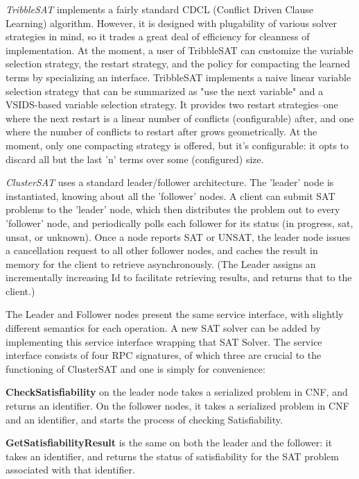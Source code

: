 \documentclass[10pt]{article}
\begin{document}
  \textit{TribbleSAT} implements a fairly standard CDCL (Conflict Driven Clause Learning) algorithm.  However, it is designed with plugability of various
  solver strategies in mind, so it trades a great deal of efficiency for cleanness of implementation.  At the moment, a user of TribbleSAT can customize
  the variable selection strategy, the restart strategy, and the policy for compacting the learned terms by specializing an interface.  TribbleSAT implements
  a naive linear variable selection strategy that can be summarized as "use the next variable" and a VSIDS-based variable selection strategy.  It provides two
  restart strategies--one where the next restart is a linear number of conflicts (configurable) after, and one where the number of conflicts to restart after grows geometrically.
  At the moment, only one compacting strategy is offered, but it's configurable:  it opts to discard all but the last 'n' terms over some (configured) size.
  
  \textit{ClusterSAT} uses a standard leader/follower architecture.  The 'leader' node is instantiated, knowing about all the 'follower' nodes.  A client
  can submit SAT problems to the 'leader' node, which then distributes the problem out to every 'follower' node, and periodically polls each follower
  for its status (in progress, sat, unsat, or unknown).  Once a node reports SAT or UNSAT, the leader node issues a cancellation request to all other follower nodes, and 
  caches the result in memory for the client to retrieve asynchronously.  (The Leader assigns an incrementally increasing Id to facilitate retrieving results, and returns that to the client.)
  
  The Leader and Follower nodes present the same service interface, with slightly different semantics for each operation.  A new SAT solver can be added by implementing
  this service interface wrapping that SAT Solver.  The service interface consists of four RPC signatures, of which three are crucial to the functioning of ClusterSAT and one is 
  simply for convenience:
  
	\textbf{CheckSatisfiability} on the leader node takes a serialized problem in CNF, and returns an identifier.  On the follower nodes, it takes a serialized problem in CNF and an identifier, and 
	starts the process of checking Satisfiability.
	
	\textbf{GetSatisfiabilityResult} is the same on both the leader and the follower:  it takes an identifier, and returns the status of satisfiability for the SAT problem associated with that identifier.
	
\end{document}
